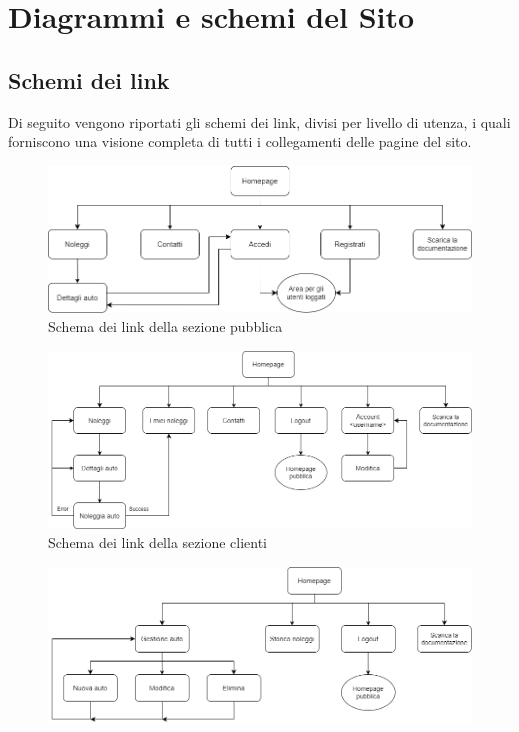 \documentclass[12pt,a4paperS]{report}
\begin{document}
	\hypertarget{diagrammi}{\chapter{Diagrammi e schemi del Sito}}
	\label{diagrammi}
		\begin{normalsize}
			\section{Schemi dei link}
				Di seguito vengono riportati gli schemi dei link, divisi per livello di utenza, i quali forniscono una visione completa di tutti i collegamenti delle pagine del sito.
				\begin{figure}[H]
					\centering
					\includegraphics[width=1.15\textwidth, height=1.15\textheight, trim=100 0 0 0,keepaspectratio]{Grafici/Link_sez_pubblica.png}
					\newline
					\caption{Schema dei link della sezione pubblica}
				\end{figure}
				\begin{figure}[H]
					\centering
					\includegraphics[width=1.15\textwidth, height=1.15\textheight, trim=100 0 0 0,keepaspectratio]{Grafici/Link_sez_clienti.png}
					\caption{Schema dei link della sezione clienti}
				\end{figure}
				\begin{figure}[H]
					\centering
					\includegraphics[width=1.15\textwidth, height=1.15\textheight, trim=100 0 0 0,keepaspectratio]{Grafici/Link_sez_staff.png}

\end{figure}
\end{normalsize}
\end{document}
